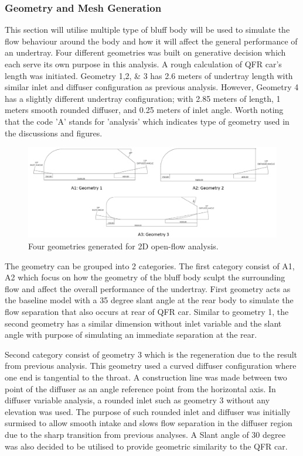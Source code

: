 \subsubsection{Geometry and Mesh Generation}
This section will utilise multiple type of bluff body will be used to simulate the flow behaviour around the body and how it will affect the general performance of an undertray. Four different geometries was built on generative decision which each serve its own purpose in this analysis. A rough calculation of QFR car's length was initiated. Geometry 1,2, \& 3 has 2.6 meters of undertray length with similar inlet and diffuser configuration as previous analysis. However, Geometry 4 has a slightly different undertray configuration; with 2.85 meters of length, 1 meters smooth rounded diffuser, and 0.25 meters of inlet angle. Worth noting that the code 'A' stands for 'analysis' which indicates type of geometry used in the discussions and figures.

\begin{figure}[!ht]
    \centering
    \includegraphics[scale = 0.5]{Figures/2D_OF/2D_OF_GEOM.png}
    \caption{Four geometries generated for 2D open-flow analysis.}
    \label{fig:2D_OF_GEOM}
\end{figure}

\noindent The geometry can be grouped into 2 categories. The first category consist of A1, A2 which focus on how the geometry of the bluff body sculpt the surrounding flow and affect the overall performance of the undertray. First geometry acts as the baseline model with a 35 degree slant angle at the rear body to simulate the flow separation that also occurs at rear of QFR car. Similar to geometry 1, the second geometry has a similar dimension without inlet variable and the slant angle with purpose of simulating an immediate separation at the rear.

\noindent Second category consist of geometry 3 which is the regeneration due to the result from previous analysis. This geometry used a curved diffuser configuration where one end is tangential to the throat. A construction line was made between two point of the diffuser as an angle reference point from the horizontal axis. In diffuser variable analysis, a rounded inlet such as geometry 3 without any elevation was used. The purpose of such rounded inlet and diffuser was initially surmised to allow smooth intake and slows flow separation in the diffuser region due to the sharp transition from previous analyses. A Slant angle of 30 degree was also decided to be utilised to provide geometric similarity to the QFR car.

